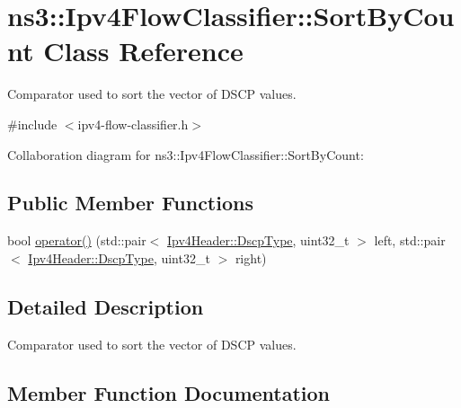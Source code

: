 \hypertarget{classns3_1_1Ipv4FlowClassifier_1_1SortByCount}{}\section{ns3\+:\+:Ipv4\+Flow\+Classifier\+:\+:Sort\+By\+Count Class Reference}
\label{classns3_1_1Ipv4FlowClassifier_1_1SortByCount}


Comparator used to sort the vector of D\+S\+CP values.  




{\ttfamily \#include $<$ipv4-\/flow-\/classifier.\+h$>$}



Collaboration diagram for ns3\+:\+:Ipv4\+Flow\+Classifier\+:\+:Sort\+By\+Count\+:
\subsection*{Public Member Functions}
\begin{DoxyCompactItemize}
\item 
bool \hyperlink{classns3_1_1Ipv4FlowClassifier_1_1SortByCount_aa187c080a0ca8aedabd02d3a7ab5e4c5}{operator()} (std\+::pair$<$ \hyperlink{classns3_1_1Ipv4Header_aaa17802e7732a689311b72d48d1a3450}{Ipv4\+Header\+::\+Dscp\+Type}, uint32\+\_\+t $>$ left, std\+::pair$<$ \hyperlink{classns3_1_1Ipv4Header_aaa17802e7732a689311b72d48d1a3450}{Ipv4\+Header\+::\+Dscp\+Type}, uint32\+\_\+t $>$ right)
\end{DoxyCompactItemize}


\subsection{Detailed Description}
Comparator used to sort the vector of D\+S\+CP values. 

\subsection{Member Function Documentation}
